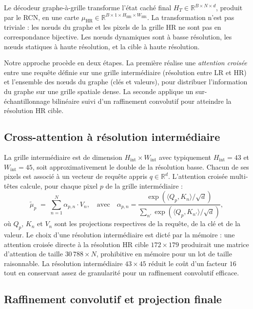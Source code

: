 \documentclass[14pt,a4paper,openany]{extreport}
\theoremstyle{definition}
\newcommand{\HR}{\ensuremath{\text{HR}}}
\newcommand{\muHR}{\ensuremath{\mu_{\HR}}}
\newcommand{\HT}{\ensuremath{H_T}}
\begin{document}
Le décodeur graphe-à-grille transforme l'état caché final $\HT \in \mathbb{R}^{B \times N \times d}$, produit par le RCN, en une carte $\muHR \in \mathbb{R}^{B \times 1 \times H_{\HR} \times W_{\HR}}$. La transformation n'est pas triviale : les nœuds du graphe et les pixels de la grille HR ne sont pas en correspondance bijective. Les nœuds dynamiques sont à basse résolution, les nœuds statiques à haute résolution, et la cible à haute résolution.

Notre approche procède en deux étapes. La première réalise une \emph{attention croisée} entre une requête définie sur une grille intermédiaire (résolution entre LR et HR) et l'ensemble des nœuds du graphe (clés et valeurs), pour distribuer l'information du graphe sur une grille spatiale dense. La seconde applique un sur-échantillonnage bilinéaire suivi d'un raffinement convolutif pour atteindre la résolution HR cible.

\subsection{Cross-attention à résolution intermédiaire}
\label{ssec:oracle-cross-attn}

La grille intermédiaire est de dimension $H_{\mathrm{int}} \times W_{\mathrm{int}}$ avec typiquement $H_{\mathrm{int}} = 43$ et $W_{\mathrm{int}} = 45$, soit approximativement le double de la résolution basse. Chacun de ses pixels est associé à un vecteur de requête appris $q \in \mathbb{R}^d$. L'attention croisée multi-têtes calcule, pour chaque pixel $p$ de la grille intermédiaire :
\begin{equation}
  \tilde{\mu}_p \;=\; \sum_{n=1}^{N} \alpha_{p,n} \cdot V_n,
  \quad \text{avec}\quad
  \alpha_{p,n} = \frac{\exp\!\left( \langle Q_p, K_n \rangle / \sqrt{d} \right)}{\sum_{n'} \exp\!\left( \langle Q_p, K_{n'} \rangle / \sqrt{d} \right)},
  \label{eq:cross-attention}
\end{equation}
où $Q_p$, $K_n$ et $V_n$ sont les projections respectives de la requête, de la clé et de la valeur. Le choix d'une résolution intermédiaire est dicté par la mémoire : une attention croisée directe à la résolution HR cible $172 \times 179$ produirait une matrice d'attention de taille $30\,788 \times N$, prohibitive en mémoire pour un lot de taille raisonnable. La résolution intermédiaire $43 \times 45$ réduit le coût d'un facteur $16$ tout en conservant assez de granularité pour un raffinement convolutif efficace.

\subsection{Raffinement convolutif et projection finale}
\label{ssec:oracle-refine}
\end{document}
